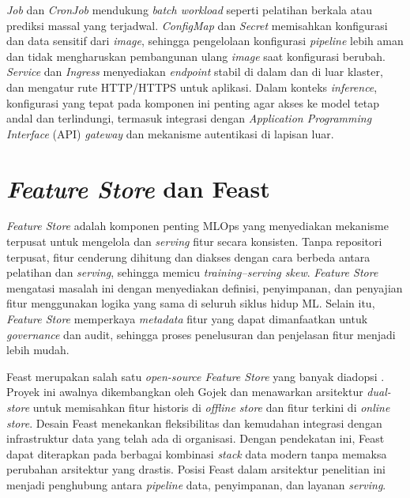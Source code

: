 \textit{Job} dan \textit{CronJob} mendukung \textit{batch workload} seperti pelatihan berkala atau prediksi massal yang terjadwal. \textit{ConfigMap} dan \textit{Secret} memisahkan konfigurasi dan data sensitif dari \textit{image}, sehingga pengelolaan konfigurasi \textit{pipeline} lebih aman dan tidak mengharuskan pembangunan ulang \textit{image} saat konfigurasi berubah. \textit{Service} dan \textit{Ingress} menyediakan \textit{endpoint} stabil di dalam dan di luar klaster, dan mengatur rute HTTP/HTTPS untuk aplikasi. Dalam konteks \textit{inference}, konfigurasi yang tepat pada komponen ini penting agar akses ke model tetap andal dan terlindungi, termasuk integrasi dengan \textit{Application Programming Interface} (API) \textit{gateway} dan mekanisme autentikasi di lapisan luar.

\section{\textit{Feature Store} dan Feast}
\label{sec:feature_store}

\textit{Feature Store} adalah komponen penting MLOps yang menyediakan mekanisme terpusat untuk mengelola dan \textit{serving} fitur secara konsisten. Tanpa repositori terpusat, fitur cenderung dihitung dan diakses dengan cara berbeda antara pelatihan dan \textit{serving}, sehingga memicu \textit{training--serving skew}. \textit{Feature Store} mengatasi masalah ini dengan menyediakan definisi, penyimpanan, dan penyajian fitur menggunakan logika yang sama di seluruh siklus hidup ML. Selain itu, \textit{Feature Store} memperkaya \textit{metadata} fitur yang dapat dimanfaatkan untuk \textit{governance} dan audit, sehingga proses penelusuran dan penjelasan fitur menjadi lebih mudah.

Feast merupakan salah satu \textit{open-source Feature Store} yang banyak diadopsi \autocite{feast2024}. Proyek ini awalnya dikembangkan oleh Gojek dan menawarkan arsitektur \textit{dual-store} untuk memisahkan fitur historis di \textit{offline store} dan fitur terkini di \textit{online store}. Desain Feast menekankan fleksibilitas dan kemudahan integrasi dengan infrastruktur data yang telah ada di organisasi. Dengan pendekatan ini, Feast dapat diterapkan pada berbagai kombinasi \textit{stack} data modern tanpa memaksa perubahan arsitektur yang drastis. Posisi Feast dalam arsitektur penelitian ini menjadi penghubung antara \textit{pipeline} data, penyimpanan, dan layanan \textit{serving}.

